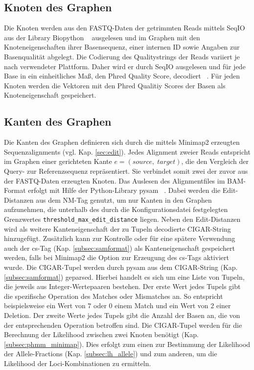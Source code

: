 \subsection{Knoten des Graphen} \label{subsec:nodes}

Die Knoten werden aus den FASTQ-Daten der getrimmten Reads mittels SeqIO aus der Library Biopython ~\cite{cock_2009_1} ausgelesen und im Graphen mit den Knoteneigenschaften ihrer Basensequenz, einer internen ID sowie Angaben zur Basenqualität abgelegt. Die Codierung des Qualitystrings der Reads variiert je nach verwendeter Plattform. Daher wird er durch SeqIO ausgelesen und für jede Base in ein einheitliches Maß, den Phred Quality Score, decodiert ~\cite{cock_2009_2}. Für jeden Knoten werden die Vektoren mit den Phred Qualitiy Scores der Basen als Knoteneigenschaft gespeichert. \\

\subsection{Kanten des Graphen} \label{subsec:edges}
Die Kanten des Graphen definieren sich durch die mittels Minimap2 erzeugten Sequenzalignments (vgl. Kap. \ref{sec:edit}). Jedes Alignment zweier Reads entspricht im Graphen einer gerichteten Kante $e = (source,\; target)$, die den Vergleich der Query- zur Referenzsequenz repräsentiert. Sie verbindet somit zwei der zuvor aus der FASTQ-Daten erzeugten Knoten. Das Auslesen des Alignmentfiles im BAM-Format erfolgt mit Hilfe der Python-Library pysam ~\cite{pysam}. Dabei werden die Edit-Distanzen aus dem NM-Tag genutzt, um nur Kanten in den Graphen aufzunehmen, die unterhalb des durch die Konfigurationsdatei festgelegten Grenzwertes \lstinline|threshold_max_edit_distance| liegen. Neben den Edit-Distanzen wird als weitere Kanteneigenschaft der zu Tupeln decodierte CIGAR-String hinzugefügt. Zusätzlich kann zur Kontrolle oder für eine spätere Verwendung auch der cs-Tag (Kap. \ref{subsec:samformat}) als Kanteneigenschaft gespeichert werden, falls bei Minimap2 die Option zur Erzeugung des cs-Tags aktiviert wurde. Die CIGAR-Tupel werden durch pysam aus dem CIGAR-String (Kap. \ref{subsec:samformat}) geparsed. Hierbei handelt es sich um eine Liste von Tupeln, die jeweils aus Integer-Wertepaaren bestehen. Der erste Wert jedes Tupels gibt die spezifische Operation des Matches oder Mismatches an. So entspricht beispielsweise ein Wert von $ 7 $ oder $ 0 $ einem Match und ein Wert von $ 2 $ einer Deletion. Der zweite Werte jedes Tupels gibt die Anzahl der Basen an, die von der entsprechenden Operation betroffen sind. Die CIGAR-Tupel werden für die Berechnung der Likelihood zwischen zwei Knoten benötigt (Kap. \ref{subsec:phmm_minimap}). Dies erfolgt zum einen zur Bestimmung der Likelihood der Allele-Fractions (Kap. \ref{subsec:lh_allele}) und zum anderen, um die Likelihood der Loci-Kombinationen zu ermitteln. \\

